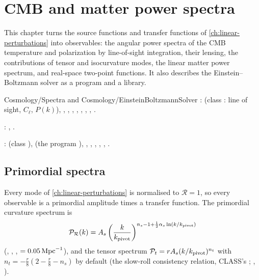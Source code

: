 \chapter{CMB and matter power spectra}\label{ch:cmb-spectra}

This chapter turns the source functions and transfer functions of \cref{ch:linear-perturbations} into observables:
the angular power spectra of the CMB temperature and polarization by line-of-sight integration, their lensing, the
contributions of tensor and isocurvature modes, the linear matter power spectrum, and real-space two-point functions.
It also describes the Einstein--Boltzmann solver as a program and a library.

\begin{modulebox}{Cosmology/Spectra and Cosmology/EinsteinBoltzmannSolver}
:  (class : line of sight, $C_\ell$, $P(k)$),
, , , ,
, , , .\par
{}: , .\par
{}:  (class
),  (the program ), ,
, , , , .
\end{modulebox}

\section{Primordial spectra}

Every mode of \cref{ch:linear-perturbations} is normalised to $\mathcal R=1$, so every observable is a primordial
amplitude times a transfer function. The primordial curvature spectrum is
\begin{equation}
\mathcal P_\mathcal R(k)=A_s\left(\frac{k}{k_{\rm pivot}}\right)^{n_s-1+\frac12\alpha_s\ln(k/k_{\rm pivot})}
\end{equation}
(, , ,  $=0.05\,\mathrm{Mpc}^{-1}$), and the tensor spectrum
$\mathcal P_t=rA_s(k/k_{\rm pivot})^{n_t}$ with $n_t=-\frac r8\left(2-\frac r8-n_s\right)$ by default (the slow-roll
consistency relation, CLASS's ; , ).

